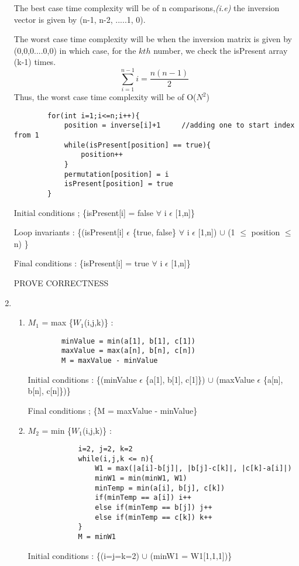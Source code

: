 \documentclass[12pt]{article}
\begin{document}
\begin{enumerate}
    The best case time complexity will be of n comparisons,\textit{(i.e)} the inversion vector is given by (n-1, n-2, .....1, 0).
    
    The worst case time complexity will be when the inversion matrix is given by (0,0,0....0,0) in which case, for the $kth$ number, we check the isPresent array (k-1) times.
     \[ \sum_{i=1}^{n-1}i = \frac{n(n-1)}{2} \]
     Thus, the worst case time complexity will be of O($N^2$)
    
    
    \begin{verbatim}
        for(int i=1;i<=n;i++){
            position = inverse[i]+1     //adding one to start index from 1
            while(isPresent[position] == true){
                position++
            }
            permutation[position] = i
            isPresent[position] = true
        }
    \end{verbatim}
    Initial conditions ; \{isPresent[i] = false $\forall$ i $\epsilon$ [1,n]\}
    
    Loop invariants : \{(isPresent[i] $\epsilon$ \{true, false\} $\forall$ i $\epsilon$ [1,n]) $\cup$ (1 $\leq$ position $\leq$ n) \}
    
    Final conditions : \{isPresent[i] = true $\forall$ i $\epsilon$ [1,n]\}
    
    PROVE CORRECTNESS 
    \item\begin{enumerate}
        \item $M_1$ = max \{$W_1$(i,j,k)\} :
        \begin{verbatim}
        minValue = min(a[1], b[1], c[1])
        maxValue = max(a[n], b[n], c[n])
        M = maxValue - minValue
        \end{verbatim}
        Initial conditions : \{(minValue $\epsilon$ \{a[1], b[1], c[1]\}) $\cup$ (maxValue $\epsilon$ \{a[n], b[n], c[n]\})\} 
        
        Final conditions ; \{M = maxValue - minValue\}
        \item$M_2$ = min \{$W_1$(i,j,k)\} : 
        \begin{verbatim}
            i=2, j=2, k=2
            while(i,j,k <= n){
                W1 = max(|a[i]-b[j]|, |b[j]-c[k]|, |c[k]-a[i]|)
                minW1 = min(minW1, W1)
                minTemp = min(a[i], b[j], c[k])
                if(minTemp == a[i]) i++
                else if(minTemp == b[j]) j++
                else if(minTemp == c[k]) k++
            }
            M = minW1
        \end{verbatim}
        Initial conditions : \{(i=j=k=2) $\cup$ (minW1 = W1[1,1,1])\}
        

\end{enumerate}
\end{enumerate}
\end{document}
